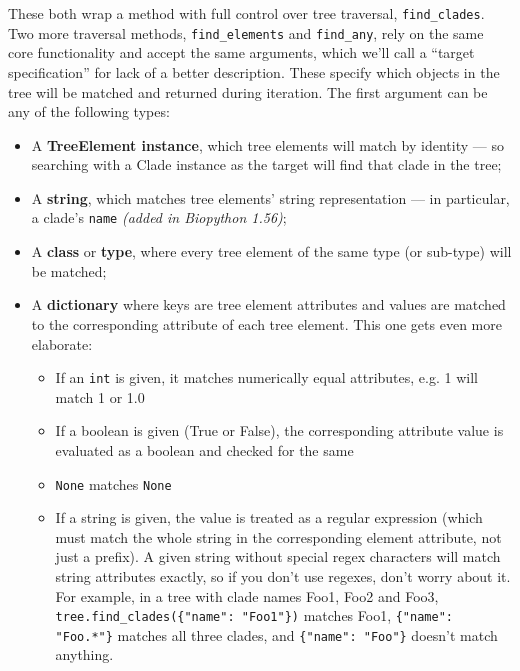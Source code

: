 \documentclass{report}
\begin{document}
These both wrap a method with full control over tree traversal, \verb|find_clades|. Two more
traversal methods, \verb|find_elements| and \verb|find_any|, rely on the same core
functionality and accept the same arguments, which we'll call a ``target specification'' for
lack of a better description. These specify which objects in the tree will be matched and
returned during iteration. The first argument can be any of the following types:

\begin{itemize}
  \item A \textbf{TreeElement instance}, which tree elements will match by identity --- so
    searching with a Clade instance as the target will find that clade in the tree;

  \item A \textbf{string}, which matches tree elements' string representation --- in
    particular, a clade's \verb|name| \textit{(added in Biopython 1.56)};

  \item A \textbf{class} or \textbf{type}, where every tree element of the same type (or
    sub-type) will be matched;

  \item A \textbf{dictionary} where keys are tree element attributes and values are matched to the
    corresponding attribute of each tree element. This one gets even more elaborate:

    \begin{itemize}
      \item If an \texttt{int} is given, it matches numerically equal attributes, e.g. 1 will
        match 1 or 1.0

      \item If a boolean is given (True or False), the corresponding attribute value is
        evaluated as a boolean and checked for the same

      \item \texttt{None} matches \texttt{None}

      \item If a string is given, the value is treated as a regular expression (which must
        match the whole string in the corresponding element attribute, not just a prefix).  A
        given string without special regex characters will match string attributes exactly, so
        if you don't use regexes, don't worry about it.  For example, in a tree with clade
        names Foo1, Foo2 and Foo3, \verb|tree.find_clades({"name": "Foo1"})| matches Foo1,
        \verb|{"name": "Foo.*"}| matches all three clades, and \verb|{"name": "Foo"}| doesn't
        match anything.


\end{itemize}
\end{itemize}
\end{document}
